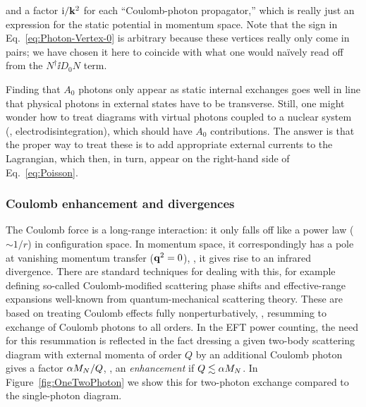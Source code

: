 %
and a factor $\mathrm{i}/\mathbf{k}^2$ for each ``Coulomb-photon propagator,'' which is 
really just an expression for the static potential in momentum space.  Note 
that the sign in Eq.~\eqref{eq:Photon-Vertex-0} is arbitrary because these 
vertices really only come in pairs; we have chosen it here to coincide with 
what one would na\"ively read off from the $N^\dagger \ii D_0 N$ term.

Finding that $A_0$ photons only appear as static internal exchanges goes well in 
line that physical photons in external states have to be transverse.  Still, 
one might wonder how to treat diagrams with virtual photons coupled to a 
nuclear system (\eg, electrodisintegration), which should have $A_0$ 
contributions.  The answer is that the proper way to treat these is to add 
appropriate external currents to the Lagrangian, which then, in turn, appear on 
the right-hand side of Eq.~\eqref{eq:Poisson}.

\subsubsection{Coulomb enhancement and divergences}

The Coulomb force is a long-range interaction: it only falls off like a power 
law ($\sim 1/r$) in configuration space.  In momentum space, it correspondingly 
has a pole at vanishing momentum transfer ($\mathbf{q}^2=0$), \ie, it gives rise to an 
infrared divergence.  There are standard techniques for dealing with this, 
for example defining so-called Coulomb-modified scattering phase shifts and 
effective-range expansions well-known from quantum-mechanical scattering 
theory.  These are based on treating Coulomb effects fully nonperturbatively, 
\ie, resumming to exchange of Coulomb photons to all orders.  In the EFT power 
counting, the need for this resummation is reflected in the fact dressing a 
given two-body scattering diagram with external momenta of order $Q$ by an 
additional Coulomb photon gives a factor $\alpha M_N/Q$, \ie, an 
\emph{enhancement} if $Q \lesssim \alpha M_N$.  In Figure~\ref{fig:OneTwoPhoton} we 
show this for two-photon exchange compared to the single-photon diagram.

